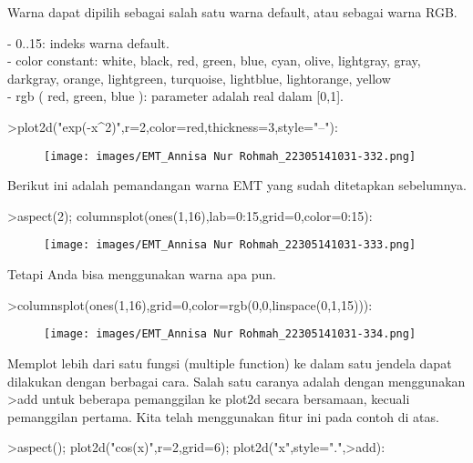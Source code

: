 \documentclass[a4paper,10pt]{article}
\begin{document}
\begin{eulernotebook}
\begin{eulercomment}
Warna dapat dipilih sebagai salah satu warna default, atau sebagai
warna RGB.

- 0..15: indeks warna default.\\
- color constant: white, black, red, green, blue, cyan, olive,
lightgray, gray, darkgray, orange, lightgreen, turquoise, lightblue,
lightorange, yellow\\
- rgb ( red, green, blue ): parameter adalah real dalam [0,1].
\end{eulercomment}
\begin{eulerprompt}
>plot2d("exp(-x^2)",r=2,color=red,thickness=3,style="--"):
\end{eulerprompt}
\begin{figure}[h]
    \centering
    \texttt{[image: images/EMT\_Annisa Nur Rohmah\_22305141031-332.png]}
\end{figure}
\begin{eulercomment}
Berikut ini adalah pemandangan warna EMT yang sudah ditetapkan
sebelumnya.
\end{eulercomment}
\begin{eulerprompt}
>aspect(2); columnsplot(ones(1,16),lab=0:15,grid=0,color=0:15):
\end{eulerprompt}
\begin{figure}[h]
    \centering
    \texttt{[image: images/EMT\_Annisa Nur Rohmah\_22305141031-333.png]}
\end{figure}
\begin{eulercomment}
Tetapi Anda bisa menggunakan warna apa pun.
\end{eulercomment}
\begin{eulerprompt}
>columnsplot(ones(1,16),grid=0,color=rgb(0,0,linspace(0,1,15))):
\end{eulerprompt}
\begin{figure}[h]
    \centering
    \texttt{[image: images/EMT\_Annisa Nur Rohmah\_22305141031-334.png]}
\end{figure}
\begin{eulercomment}
Memplot lebih dari satu fungsi (multiple function) ke dalam satu
jendela dapat dilakukan dengan berbagai cara. Salah satu caranya
adalah dengan menggunakan \textgreater{}add untuk beberapa pemanggilan ke plot2d
secara bersamaan, kecuali pemanggilan pertama. Kita telah menggunakan
fitur ini pada contoh di atas.
\end{eulercomment}
\begin{eulerprompt}
>aspect(); plot2d("cos(x)",r=2,grid=6); plot2d("x",style=".",>add):

\end{eulerprompt}
\end{eulernotebook}
\end{document}
